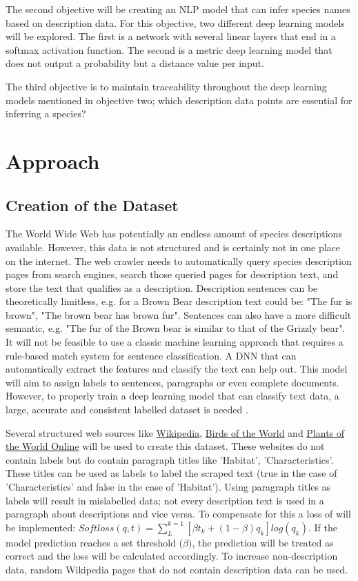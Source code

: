 \documentclass[a4paper, 12pt, oneside]{book} %
\begin{document}
The second objective will be creating an NLP model that can infer species names based on description data. 
For this objective, two different deep learning models will be explored.
The first is a network with several linear layers that end in a softmax activation function.
The second is a metric deep learning model that does not output a probability but a distance value per input.

The third objective is to maintain traceability throughout the deep learning models mentioned in objective two; which description data points are essential for inferring a species?


\section{Approach} 
\subsection{Creation of the Dataset}
The World Wide Web has potentially an endless amount of species descriptions available.
However, this data is not structured and is certainly not in one place on the internet.
The web crawler needs to automatically query species description pages from search engines, search those queried pages for description text, and store the text that qualifies as a description.
Description sentences can be theoretically limitless, e.g. for a Brown Bear description text could be: "The fur is brown", "The brown bear has brown fur".
Sentences can also have a more difficult semantic, e.g. "The fur of the Brown bear is similar to that of the Grizzly bear".
It will not be feasible to use a classic machine learning approach that requires a rule-based match system for sentence classification. 
A DNN that can automatically extract the features and classify the text can help out.
This model will aim to assign labels to sentences, paragraphs or even complete documents. 
However, to properly train a deep learning model that can classify text data, a large, accurate and consistent labelled dataset is needed \autocite{munappy_data_2019}.

Several structured web sources like \href{http://www.Wikipedia.com}{Wikipedia}, \href{https://birdsoftheworld.org}{Birds of the World} and \href{http://powo.science.kew.org/}{Plants of the World Online} will be used to create this dataset.
These websites do not contain labels but do contain paragraph titles like 'Habitat', 'Characteristics'. 
These titles can be used as labels to label the scraped text (true in the case of 'Characteristics' and false in the case of 'Habitat').
Using paragraph titles as labels will result in mislabelled data; not every description text is used in a paragraph about descriptions and vice versa.
To compensate for this a loss of \textcite{reed_training_2015} will be implemented: \( Softloss(q, t) =  \sum_{L}^{k=1} [\beta t _k + (1- \beta )q _k]log(q _k) \).
If the model prediction reaches a set threshold (\(\beta)\), the prediction will be treated as correct and the loss will be calculated accordingly.
To increase non-description data, random Wikipedia pages that do not contain description data can be used.
\end{document}
